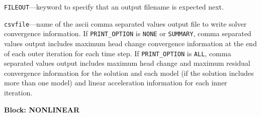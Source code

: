 \begin{description}
\item \texttt{FILEOUT}---keyword to specify that an output filename is expected next.

\item \texttt{csvfile}---name of the ascii comma separated values output file to write solver convergence information. If \texttt{PRINT\_OPTION} is \texttt{NONE} or \texttt{SUMMARY}, comma separated values output includes maximum head change convergence information at the end of each outer iteration for each time step. If \texttt{PRINT\_OPTION} is \texttt{ALL}, comma separated values output includes maximum head change and maximum residual convergence information for the solution and each model (if the solution includes more than one model) and linear acceleration information for each inner iteration.

\end{description}
\item \textbf{Block: NONLINEAR}

